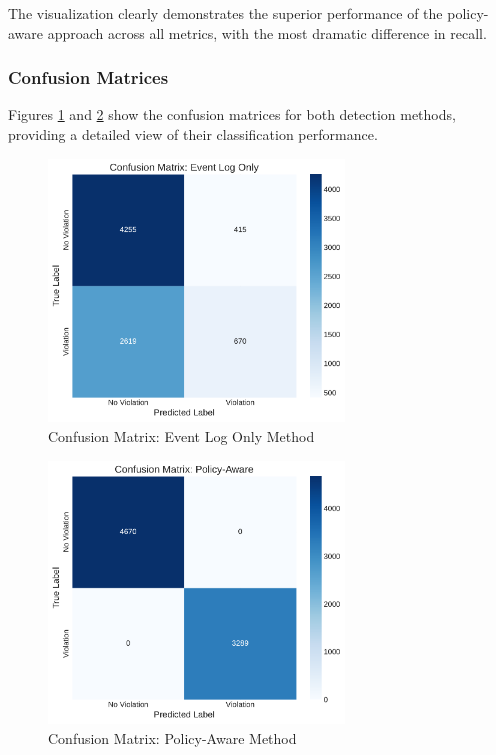 The visualization clearly demonstrates the superior performance of the policy-aware approach across all metrics, with the most dramatic difference in recall.

\subsubsection{Confusion Matrices}

Figures \ref{fig:eventlog-confusion} and \ref{fig:policy-confusion} show the confusion matrices for both detection methods, providing a detailed view of their classification performance.

\begin{figure}[h]
\centering
\includegraphics[width=0.7\textwidth]{paper_sections/eventlog_confusion_matrix.pdf}
\caption{Confusion Matrix: Event Log Only Method}
\label{fig:eventlog-confusion}
\end{figure}

\begin{figure}[h]
\centering
\includegraphics[width=0.7\textwidth]{paper_sections/policy_confusion_matrix.pdf}
\caption{Confusion Matrix: Policy-Aware Method}
\label{fig:policy-confusion}
\end{figure}

